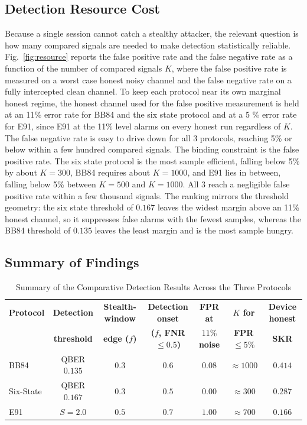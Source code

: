 \documentclass[conference]{IEEEtran}
\begin{document}
\subsection{Detection Resource Cost}
\label{subsec:resource}
Because a single session cannot catch a stealthy attacker, the relevant question
is how many compared signals are needed to make detection statistically reliable.
Fig.~\ref{fig:resource} reports the false positive rate and the false negative
rate as a function of the number of compared signals $K$, where the false positive
rate is measured on a worst case honest noisy channel and the false negative rate
on a fully intercepted clean channel. To keep each protocol near its own marginal
honest regime, the honest channel used for the false positive measurement is held
at an 11\% error rate for BB84 and the six state protocol and at a 5
\% error rate for E91, since E91 at the 11\% level alarms on every
honest run regardless of $K$. The false negative rate is easy to drive down for
all 3 protocols, reaching 5\% or below within a few hundred compared
signals. The binding constraint is the false positive rate. The six state protocol
is the most sample efficient, falling below 5\% by about $K = 300$, BB84
requires about $K = 1000$, and E91 lies in between, falling below 5\%
between $K = 500$ and $K = 1000$. All 3 reach a negligible false positive rate
within a few thousand signals. The ranking mirrors the threshold geometry: the six
state threshold of $0.167$ leaves the widest margin above an 11\% honest
channel, so it suppresses false alarms with the fewest samples, whereas the BB84
threshold of $0.135$ leaves the least margin and is the most sample hungry.

\subsection{Summary of Findings}

\begin{table}[t]
\caption{Summary of the Comparative Detection Results Across the Three Protocols}
\label{tab:summary}
\begin{center}
\setlength{\tabcolsep}{6pt}
\renewcommand{\arraystretch}{1.3}
\footnotesize
\begin{tabular}{|l|c|c|c|c|c|c|}
\hline
\textbf{Protocol} & \textbf{Detection} & \textbf{Stealth-window} & \textbf{Detection onset} & \textbf{FPR at} & \textbf{$K$ for} & \textbf{Device honest} \\
 & \textbf{threshold} & \textbf{edge ($f$)} & \textbf{($f$, FNR $\le 0.5$)} & \textbf{$11\%$ noise} & \textbf{FPR $\le 5\%$} & \textbf{SKR} \\ \hline
BB84      & QBER $0.135$ & $0.3$ & $0.6$ & $0.08$ & $\approx 1000$ & $0.414$ \\ \hline
Six-State & QBER $0.167$ & $0.3$ & $0.5$ & $0.00$ & $\approx 300$  & $0.287$ \\ \hline
E91       & $S = 2.0$    & $0.5$ & $0.7$ & $1.00$ & $\approx 700$  & $0.166$ \\ \hline
\end{tabular}
\end{center}
\end{table}
\end{document}
